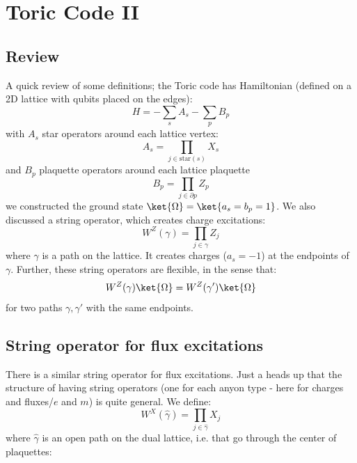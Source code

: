 \section{Toric Code II}
\subsection{Review}
A quick review of some definitions; the Toric code has Hamiltonian (defined on a 2D lattice with qubits placed on the edges):
\begin{equation}
    H = - \sum_s A_s - \sum_p B_p
\end{equation}
with $A_s$ star operators around each lattice vertex:
\begin{equation}
    A_s = \prod_{j \in \text{star}(s)}X_s
\end{equation}
and $B_p$ plaquette operators around each lattice plaquette
\begin{equation}
    B_p = \prod_{j \in \partial p}Z_p
\end{equation}
we constructed the ground state $\ket{\Omega} = \ket{a_s = b_p = 1}$. We also discussed a string operator, which creates charge excitations:
\begin{equation}
    W^Z(\gamma) = \prod_{j \in \gamma}Z_j
\end{equation}
where $\gamma$ is a path on the lattice. It creates charges ($a_s = -1$) at the endpoints of $\gamma$. Further, these string operators are flexible, in the sense that:
\begin{equation}
    W^Z(\gamma)\ket{\Omega} = W^Z(\gamma')\ket{\Omega}
\end{equation}
for two paths $\gamma, \gamma'$ with the same endpoints.

\subsection{String operator for flux excitations}
There is a similar string operator for flux excitations. Just a heads up that the structure of having string operators (one for each anyon type - here for charges and fluxes/$e$ and $m$) is quite general. We define:
\begin{equation}
    W^X(\hat{\gamma}) = \prod_{j \in \hat{\gamma}}X_j
\end{equation}
where $\hat{\gamma}$ is an open path on the dual lattice, i.e. that go through the center of plaquettes:

